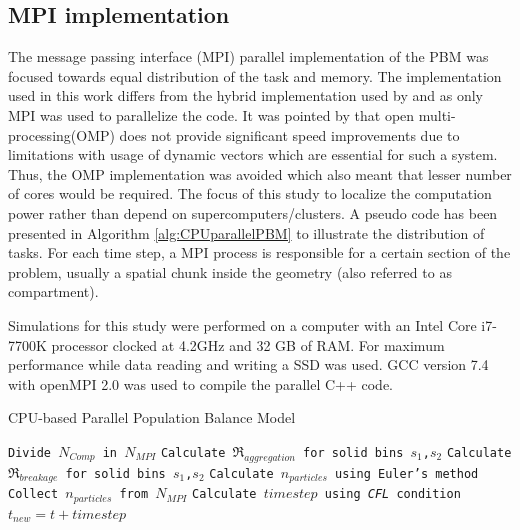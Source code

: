\documentclass[review]{elsarticle}
\begin{document}
\begin{linenumbers}
\subsection{MPI implementation}
The message passing interface (MPI) parallel implementation of the PBM was 
focused towards equal distribution of the task and memory. The implementation 
used in this work differs from the hybrid implementation used by \citep{Bettencourt2017}
and \cite{Sampat2018} as only MPI was used to parallelize the code. It 
was pointed by \cite{Sampat2018} that open multi-processing(OMP) does not 
provide significant speed improvements due to limitations with usage of 
dynamic vectors which are essential for such a system. Thus, the OMP 
implementation was avoided which also meant that lesser number of cores 
would be required. The focus of this study to localize the computation power 
rather than depend on supercomputers/clusters.  
A pseudo code has been presented in Algorithm \ref{alg:CPUparallelPBM}
to illustrate the distribution of tasks. For each time step, a MPI process is responsible 
for a certain section of the problem, usually a spatial chunk inside the geometry 
(also referred to as compartment).  



Simulations for this study were performed on a computer with an Intel Core i7-7700K 
processor clocked at 4.2GHz and 32 GB of RAM. For maximum performance while 
data reading and writing a SSD was used. GCC version 7.4 with openMPI 2.0 
was used to compile the parallel C++ code.

\begin{algorithm}
     \scriptsize
     \caption{CPU-based Parallel Population Balance Model}
     \label{alg:CPUparallelPBM}
     \begin{algorithmic}[1]
     \State \texttt{Divide $N_{Comp}$ in $N_{MPI}$}
     \State \texttt{Calculate $\Re_{aggregation}$ for solid bins $s_1$,$s_2$}
     \State \texttt{Calculate $\Re_{breakage}$ for solid bins $s_1$,$s_2$}
     \State \texttt{Calculate $n_{particles}$ using Euler's method}
     \EndFor
     \State \texttt{Collect $n_{particles}$ from $N_{MPI}$}
     \State \texttt{Calculate $timestep$ using \textit{CFL} condition}
     \State \texttt{$t_{new} = t + timestep$}
     \EndWhile
     \EndProcedure
     \end{algorithmic}
 \end{algorithm}   



\end{linenumbers}
\end{document}
